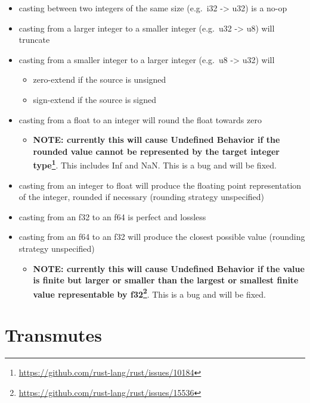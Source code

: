 \documentclass[a4paper,]{book}
\renewcommand{\href}[2]{#2\footnote{\url{#1}}}
\providecommand{\tightlist}{%
  \setlength{\itemsep}{0pt}\setlength{\parskip}{0pt}}
\begin{document}
\begin{itemize}
\tightlist
\item
  casting between two integers of the same size (e.g.~i32
  -\textgreater{} u32) is a no-op
\item
  casting from a larger integer to a smaller integer (e.g.~u32
  -\textgreater{} u8) will truncate
\item
  casting from a smaller integer to a larger integer (e.g.~u8
  -\textgreater{} u32) will

  \begin{itemize}
  \tightlist
  \item
    zero-extend if the source is unsigned
  \item
    sign-extend if the source is signed
  \end{itemize}
\item
  casting from a float to an integer will round the float towards zero

  \begin{itemize}
  \tightlist
  \item
    \textbf{\href{https://github.com/rust-lang/rust/issues/10184}{NOTE:
    currently this will cause Undefined Behavior if the rounded value
    cannot be represented by the target integer type}}. This includes
    Inf and NaN. This is a bug and will be fixed.
  \end{itemize}
\item
  casting from an integer to float will produce the floating point
  representation of the integer, rounded if necessary (rounding strategy
  unspecified)
\item
  casting from an f32 to an f64 is perfect and lossless
\item
  casting from an f64 to an f32 will produce the closest possible value
  (rounding strategy unspecified)

  \begin{itemize}
  \tightlist
  \item
    \textbf{\href{https://github.com/rust-lang/rust/issues/15536}{NOTE:
    currently this will cause Undefined Behavior if the value is finite
    but larger or smaller than the largest or smallest finite value
    representable by f32}}. This is a bug and will be fixed.
  \end{itemize}
\end{itemize}

\section{Transmutes}\label{sec--transmutes}
\end{document}
